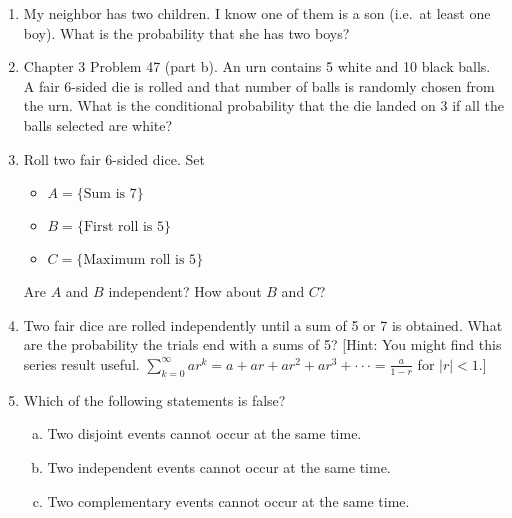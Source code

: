 \documentclass[11pt]{article}
\begin{document}
\begin{enumerate}
\item My neighbor has two children. I know one of them is a son (i.e.\ at least one boy). What is the probability that she has two boys?

\item Chapter 3 Problem 47 (part b). An urn contains 5 white and 10 black balls. A fair 6-sided die is rolled and that number of balls is randomly chosen from the urn. What is the conditional probability that the die landed on 3 if all the balls selected are white?

\item Roll two fair 6-sided dice. Set
\begin{itemize}
\item $A = \{ \text{Sum is 7} \}$
\item $B = \{ \text{First roll is 5} \}$
\item $C = \{ \text{Maximum roll is 5} \}$
\end{itemize}
Are $A$ and $B$ independent? How about $B$ and $C$?

\item Two fair dice are rolled independently until a sum of 5 or 7 is obtained. What are the probability
the trials end with a sums of 5? [Hint: You might find this series result useful. $\sum_{k=0}^{\infty}ar^k = a + ar + ar^2 + ar^3 + \cdot \cdot \cdot = \frac{a}{1-r}$ for $|r| < 1$.]

\item Which of the following statements is false?
\begin{enumerate}[(a)]
\item Two disjoint events cannot occur at the same time.
\item Two independent events cannot occur at the same time.
\item Two complementary events cannot occur at the same time.
\end{enumerate}



\end{enumerate}
\end{document}
